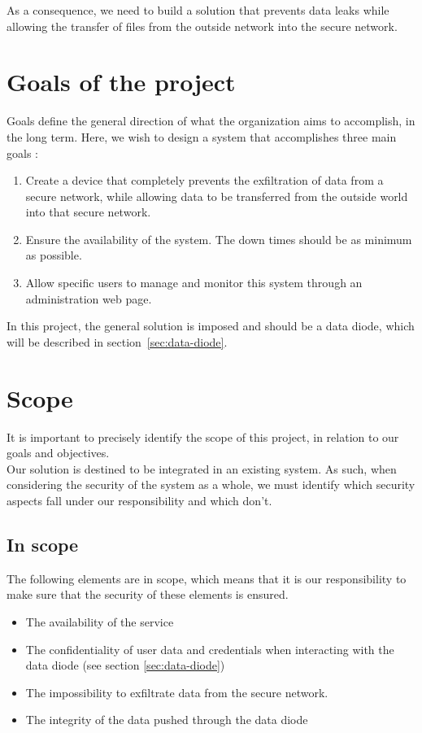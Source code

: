 \documentclass[a4paper,11pt]{article}
\begin{document}
As a consequence, we need to build a solution that prevents data leaks while allowing the transfer of files from the outside network into the secure network.

\section{Goals of the project}
\label{sec:goals}
Goals define the general direction of what the organization aims to accomplish, in the long term. Here, we wish to design a system that accomplishes three main goals :

\begin{enumerate}
\item{Create a device that completely prevents the exfiltration of data from a secure network, while allowing data to be transferred from the outside world into that secure network.}
\item{Ensure the availability of the system. The down times should be as minimum as possible.}
\item{Allow specific users to manage and monitor this system through an administration web page.}
\end{enumerate}

In this project, the general solution is imposed and should be a data diode, which will be described in section~\ref{sec:data-diode}.

\section{Scope}
It is important to precisely identify the scope of this project, in relation to our goals and objectives.\\

Our solution is destined to be integrated in an existing system. As such, when considering the security of the system as a whole, we must identify which security aspects fall under our responsibility and which don't. 

\subsection{In scope}
The following elements are in scope, which means that it is our responsibility to make sure that the security of these elements is ensured.

\begin{itemize}
\item{The availability of the service}
\item{The confidentiality of user data and credentials when interacting with the data diode (see section \ref{sec:data-diode})}
\item{The impossibility to exfiltrate data from the secure network.}
\item{The integrity of the data pushed through the data diode}
\end{itemize}
\end{document}
